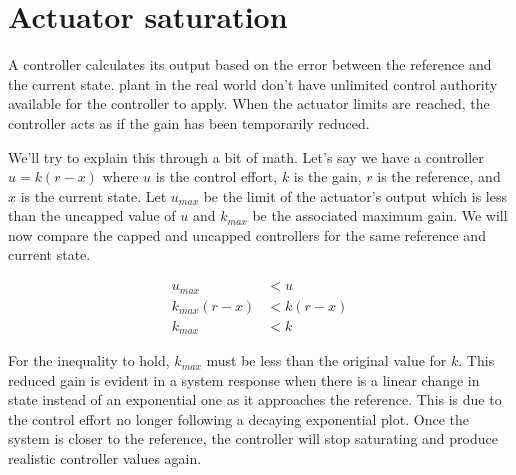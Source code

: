 \section{Actuator saturation}

A controller calculates its output based on the error between the
\gls{reference} and the current \gls{state}. \Gls{plant} in the real world don't
have unlimited control authority available for the controller to apply. When the
actuator limits are reached, the controller acts as if the gain has been
temporarily reduced.

We'll try to explain this through a bit of math. Let's say we have a controller
$u = k(r - x)$ where $u$ is the \gls{control effort}, $k$ is the gain, $r$ is
the \gls{reference}, and $x$ is the current \gls{state}. Let $u_{max}$ be the
limit of the actuator's output which is less than the uncapped value of $u$ and
$k_{max}$ be the associated maximum gain. We will now compare the capped and
uncapped controllers for the same \gls{reference} and current \gls{state}.

\begin{align*}
  u_{max} &< u \\
  k_{max}(r - x) &< k(r - x) \\
  k_{max} &< k
\end{align*}

For the inequality to hold, $k_{max}$ must be less than the original value for
$k$. This reduced gain is evident in a \gls{system response} when there is a
linear change in state instead of an exponential one as it approaches the
\gls{reference}. This is due to the \gls{control effort} no longer following a
decaying exponential plot. Once the \gls{system} is closer to the
\gls{reference}, the controller will stop saturating and produce realistic
controller values again.

